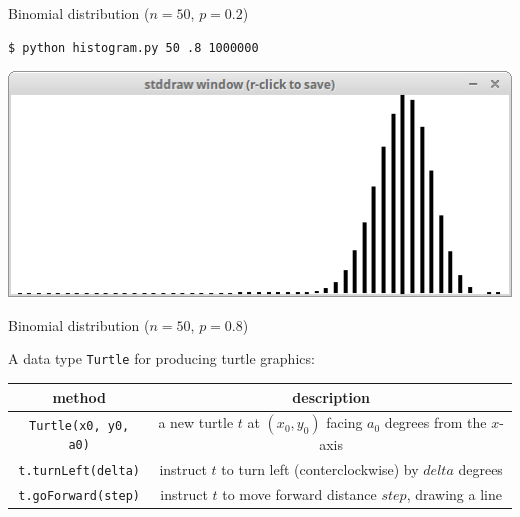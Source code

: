 \documentclass[8pt,a4paper,compress,handout]{beamer}
\begin{document}
\begin{frame}[fragile]
\begin{minipage}{100pt}
\begin{center}
\tiny Binomial distribution ($n=50$, $p=0.2$)
\end{center}
\end{minipage}%

\bigskip

\begin{minipage}{200pt}
\begin{lstlisting}[language={}]
$ python histogram.py 50 .8 1000000
\end{lstlisting}
\end{minipage}%
\hfill
\begin{minipage}{100pt}
\begin{center}
\includegraphics[scale=0.2]{figures/histogram3.png}

\smallskip

\tiny Binomial distribution ($n=50$, $p=0.8$)
\end{center}
\end{minipage}%
\end{frame}

\begin{frame}[fragile]
A data type \lstinline{Turtle} for producing turtle graphics:
\begin{center}
\begin{tabular}{cc}
method & description \\ \hline
\lstinline$Turtle(x0, y0, a0)$ & a new turtle $t$ at $(x_0, y_0)$ facing $a_0$ degrees from the $x$-axis \\
\lstinline$t.turnLeft(delta)$ & instruct $t$ to turn left (conterclockwise) by $delta$ degrees \\
\lstinline$t.goForward(step)$ & instruct $t$ to move forward distance $step$, drawing a line
\end{tabular} 
\end{center}
\end{frame}
\end{document}
